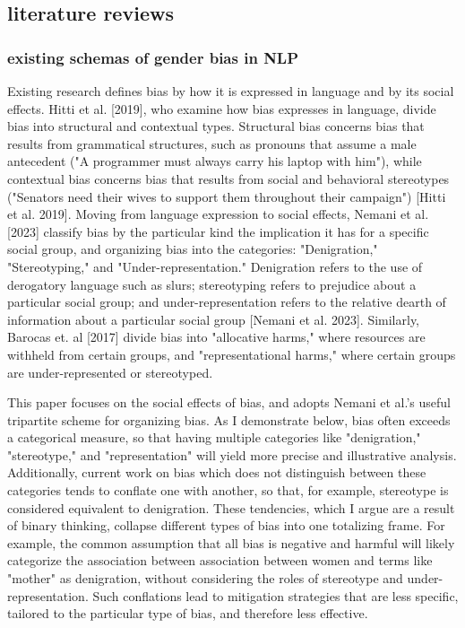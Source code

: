 \documentclass[11pt]{article}
\begin{document}
\subsection{literature reviews}
\label{sec:org9a19748}
\subsubsection{existing schemas of gender bias in NLP}
\label{sec:org4bf89f7}
Existing research defines bias by how it is expressed in language and
by its social effects. Hitti et al. [2019], who examine how bias
expresses in language, divide bias into structural and contextual
types. Structural bias concerns bias that results from grammatical
structures, such as pronouns that assume a male antecedent ("A
programmer must always carry his laptop with him"), while contextual
bias concerns bias that results from social and behavioral stereotypes
("Senators need their wives to support them throughout their
campaign") [Hitti et al. 2019]. Moving from language expression to
social effects, Nemani et al. [2023] classify bias by the particular
kind the implication it has for a specific social group, and
organizing bias into the categories: "Denigration," "Stereotyping,"
and "Under-representation." Denigration refers to the use of
derogatory language such as slurs; stereotyping refers to prejudice
about a particular social group; and under-representation refers to
the relative dearth of information about a particular social group
[Nemani et al. 2023]. Similarly, Barocas et. al [2017] divide bias
into "allocative harms," where resources are withheld from certain
groups, and "representational harms," where certain groups are
under-represented or stereotyped.

This paper focuses on the social effects of bias, and adopts Nemani et
al.'s useful tripartite scheme for organizing bias. As I demonstrate
below, bias often exceeds a categorical measure, so that having
multiple categories like "denigration," "stereotype," and
"representation" will yield more precise and illustrative analysis.
Additionally, current work on bias which does not distinguish between
these categories tends to conflate one with another, so that, for
example, stereotype is considered equivalent to denigration. These
tendencies, which I argue are a result of binary thinking, collapse
different types of bias into one totalizing frame. For example, the
common assumption that all bias is negative and harmful will likely
categorize the association between association between women and terms
like "mother" as denigration, without considering the roles of
stereotype and under-representation. Such conflations lead to
mitigation strategies that are less specific, tailored to the
particular type of bias, and therefore less effective.
\end{document}
